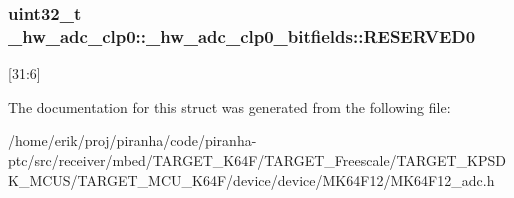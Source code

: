 \subsubsection[{\texorpdfstring{R\+E\+S\+E\+R\+V\+E\+D0}{RESERVED0}}]{\setlength{\rightskip}{0pt plus 5cm}uint32\+\_\+t \+\_\+hw\+\_\+adc\+\_\+clp0\+::\+\_\+hw\+\_\+adc\+\_\+clp0\+\_\+bitfields\+::\+R\+E\+S\+E\+R\+V\+E\+D0}\hypertarget{struct__hw__adc__clp0_1_1__hw__adc__clp0__bitfields_aef53153bd58c26f2df021810de0f760a}{}\label{struct__hw__adc__clp0_1_1__hw__adc__clp0__bitfields_aef53153bd58c26f2df021810de0f760a}
\mbox{[}31\+:6\mbox{]} 

The documentation for this struct was generated from the following file\+:\begin{DoxyCompactItemize}
\item 
/home/erik/proj/piranha/code/piranha-\/ptc/src/receiver/mbed/\+T\+A\+R\+G\+E\+T\+\_\+\+K64\+F/\+T\+A\+R\+G\+E\+T\+\_\+\+Freescale/\+T\+A\+R\+G\+E\+T\+\_\+\+K\+P\+S\+D\+K\+\_\+\+M\+C\+U\+S/\+T\+A\+R\+G\+E\+T\+\_\+\+M\+C\+U\+\_\+\+K64\+F/device/device/\+M\+K64\+F12/M\+K64\+F12\+\_\+adc.\+h\end{DoxyCompactItemize}
